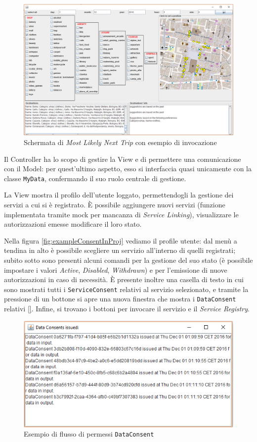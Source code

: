 \begin{figure}
	\centering
	\includegraphics[width=0.85\linewidth]{pictures/MLNTPanel.png}
	\caption{Schermata di\textit{ Most Likely Next Trip} con esempio di invocazione}
	\label{fig:MLNTPanel}
\end{figure}

Il Controller ha lo scopo di gestire la View e di permettere una comunicazione con il Model: per quest’ultimo aspetto, esso si interfaccia quasi unicamente con la classe \texttt{MyData}, confermando il suo ruolo centrale di gestione.

La View mostra il profilo dell’utente loggato, permettendogli la gestione dei servizi a cui si è registrato. È possibile aggiungere nuovi servizi (funzione implementata tramite mock per mancanza di \textit{Service Linking}), visualizzare le autorizzazioni emesse modificare il loro stato.

Nella figura \ref{fig:exampleConsentInProj} vediamo il profile utente: dal menù a tendina in alto è possibile scegliere un servizio all’interno di quelli registrati; subito sotto sono presenti alcuni comandi per la gestione del suo stato (è possibile impostare i valori \textit{Active}, \textit{Disabled}, \textit{Withdrawn}) e per l’emissione di nuove autorizzazioni in caso di necessità. È presente inoltre una casella di testo in cui sono mostrati tutti i \texttt{ServiceConsent} relativi al servizio selezionato, e tramite la pressione di un bottone si apre una nuova finestra che mostra i \texttt{DataConsent} relativi \ref{}. Infine, si trovano i bottoni per invocare il servizio e il \textit{Service Registry}.
\begin{figure}
	\centering
	\includegraphics[width=0.5\linewidth]{pictures/DataConsentFrame.png}
	\caption{Esempio di flusso di permessi \texttt{DataConsent}}
	\label{fig:DataConsentFrame}
\end{figure}